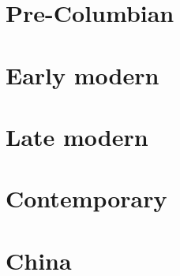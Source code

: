 \documentclass[oneside]{book}
\begin{document}
\part{Pre-Columbian}




\part{Early modern}



\part{Late modern}











\part{Contemporary}

\part{China}
\end{document}
